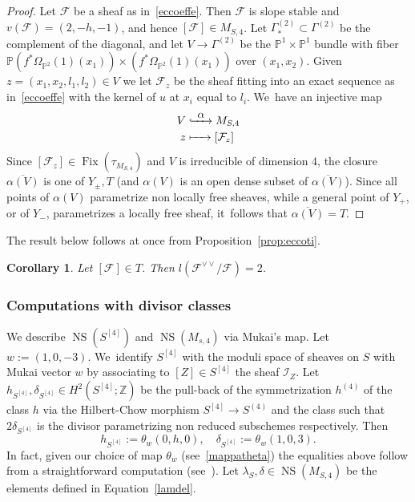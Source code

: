 \documentclass[JEP,XML,SOM,Unicode,published]{cedram}
\newcommand\To[1]{\mathchoice{\xrightarrow{\textstyle\kern4pt#1\kern3pt}}{\stackrel{#1}{\longrightarrow}}{}{}}
\newcommand\Hto[1]{\mathrel{\lhook\joinrel\To{#1}}}
\newcommand\Mto[1]{\mathrel{\mapstochar\To{#1}}}
\newcommand{\PP}{{\mathbb P}}\let\P\PP
\newcommand{\ZZ}{{\mathbb Z}}\let\Z\ZZ
\newcommand\cF{\mathcal{F}}
\newcommand\cI{\mathcal{I}}
\DeclareMathOperator{\Fix}{Fix}
\DeclareMathOperator{\NS}{NS}
\let\ov\overline
\newtheorem{coro}[lemm]{Corollary}
\theoremstyle{definition}
\begin{document}
\begin{proof}
Let $\cF$ be a sheaf as in~\eqref{eccoeffe}. Then $\cF$ is slope stable and $v(\cF)=(2,-h,-1)$, and hence $[\cF]\in M_{S,4}$. Let ${\mathsf\Gamma}^{(2)}_{*}\subset {\mathsf\Gamma}^{(2)}$ be the complement of the diagonal, and
let $V\to{\mathsf\Gamma}^{(2)}$ be the $\PP^1\times\PP^1$ bundle with fiber $\PP(f^*\Omega_{\P^2}(1)(x_1))\times(f^*\Omega_{\P^2}(1)(x_1))$ over $(x_1,x_2)$.
Given $z=(x_1,x_2,l_1,l_2)\in V$ we let $\cF_z$ be the sheaf fitting into an exact sequence as in~\eqref{eccoeffe} with the kernel of $u$ at $x_i$ equal to $l_i$. We~have an injective map
\begin{equation*}
\begin{aligned}
V & \Hto{\alpha} M_{S,4} \\
z & \Mto{\hphantom{\alpha}} [\cF_z]
\end{aligned}
\end{equation*}
Since $[\cF_z]\in\Fix(\tau_{M_{S,4}})$ and $V$ is irreducible of dimension $4$, the closure $\ov{\alpha(V)}$ is one of $Y_{\pm},T$ (and $\alpha(V)$ is an open dense subset of $\ov{\alpha(V)}$). Since all points of $\alpha(V)$ parametrize non locally free sheaves, while a general point of $Y_{+}$, or of $Y_{-}$, parametrizes a locally free sheaf, it~follows that $\ov{\alpha(V)}=T$.
\end{proof}

The result below follows at once from Proposition~\ref{prop:eccoti}.

\begin{coro}\label{coro:eccoti}
Let $[\cF]\in T$. Then $l(\cF^{\vee\vee}/\cF)=2$.
\end{coro}

\subsubsection*{Computations with divisor classes}
We describe $\NS(S^{[4]})$ and $\NS(M_{s,4})$ via Mukai's map.
Let $w:=(1,0,-3)$. We~identify $S^{[4]}$ with the moduli space of sheaves on $S$ with Mukai vector $w$ by associating to $[Z]\in S^{[4]}$ the sheaf $\cI_Z$.
Let $h_{S^{[4]}},\delta_{S^{[4]}}\in H^2(S^{[4]};\ZZ)$ be the pull-back of the symmetrization $h^{(4)}$ of the class $h$ via the
Hilbert-Chow morphism $S^{[4]}\to S^{(4)}$ and the class such that $2\delta_{S^{[4]}}$ is the divisor parametrizing non reduced subschemes respectively. Then
\begin{equation*}
h_{S^{[4]}}:=\theta_w(0,h,0),\quad \delta_{S^{[4]}}:=\theta_w(1,0,3).
\end{equation*}
In fact, given our choice of map $\theta_w$ (see~\ref{mappatheta}) the equalities above follow from a straightforward computation (see~\cite[p.\,630]{Kieran:weight2}).
Let $\lambda_S,\delta\in \NS(M_{S,4})$ be the elements defined in Equation~\eqref{lamdel}.
\end{document}
